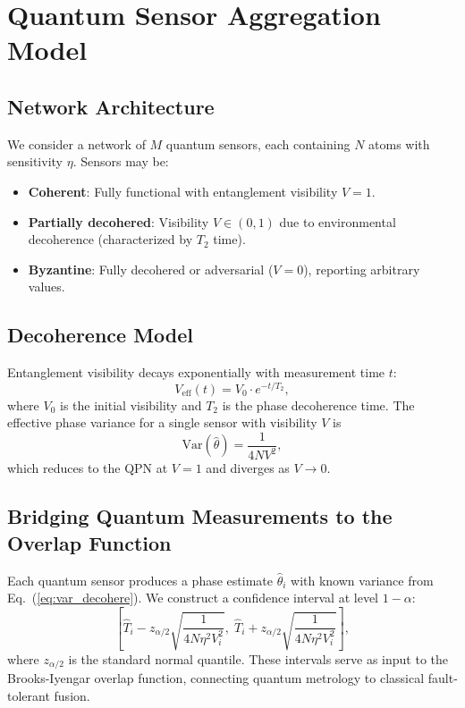 \documentclass[twocolumn,11pt]{article}
\begin{document}
\section{Quantum Sensor Aggregation Model}
\label{sec:model}

\subsection{Network Architecture}

We consider a network of $M$ quantum sensors, each containing
$N$ atoms with sensitivity $\eta$.
Sensors may be:
\begin{itemize}
    \item \textbf{Coherent}: Fully functional with entanglement
          visibility $V = 1$.
    \item \textbf{Partially decohered}: Visibility $V \in (0, 1)$
          due to environmental decoherence (characterized by
          $T_2$ time).
    \item \textbf{Byzantine}: Fully decohered or adversarial
          ($V = 0$), reporting arbitrary values.
\end{itemize}

\subsection{Decoherence Model}

Entanglement visibility decays exponentially with measurement
time $t$:
\begin{equation}
    V_{\mathrm{eff}}(t) = V_0 \cdot e^{-t/T_2},
    \label{eq:decoherence}
\end{equation}
where $V_0$ is the initial visibility and $T_2$ is the phase
decoherence time.
The effective phase variance for a single sensor with visibility
$V$ is
\begin{equation}
    \mathrm{Var}(\hat{\theta}) = \frac{1}{4N V^2},
    \label{eq:var_decohere}
\end{equation}
which reduces to the QPN at $V=1$ and diverges as $V \to 0$.

\subsection{Bridging Quantum Measurements to the Overlap Function}

Each quantum sensor produces a phase estimate $\hat{\theta}_i$
with known variance from Eq.~(\ref{eq:var_decohere}).
We construct a confidence interval at level $1-\alpha$:
\begin{equation}
    \left[\hat{T}_i - z_{\alpha/2}\sqrt{\frac{1}{4N\eta^2 V_i^2}},\;
          \hat{T}_i + z_{\alpha/2}\sqrt{\frac{1}{4N\eta^2 V_i^2}}\right],
    \label{eq:ci}
\end{equation}
where $z_{\alpha/2}$ is the standard normal quantile.
These intervals serve as input to the Brooks-Iyengar overlap
function, connecting quantum metrology to classical fault-tolerant
fusion.
\end{document}
